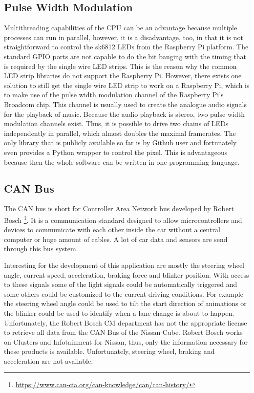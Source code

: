 \subsection{Pulse Width Modulation}
\label{ssec:pwm}
Multithreading capabilities of the CPU can be an advantage because multiple processes can run in parallel, however, it is a disadvantage, too, in that it is not straightforward to control the sk6812 LEDs from the Raspberry Pi platform. The standard GPIO ports are not capable to do the bit banging with the timing that is required by the single wire LED strips. This is the reason why the common LED strip libraries do not support the Raspberry Pi. However, there exists one solution to still get the single wire LED strip to work on a Raspberry Pi, which is to make use of the pulse width modulation channel of the Raspberry Pi's Broadcom chip. This channel is usually used to create the analogue audio signals for the playback of music. Because the audio playback is stereo, two pulse width modulation channels exist. Thus, it is possible to drive two chains of LEDs independently in parallel, which almost doubles the maximal framerates. The only library that is publicly available so far is by Github user \cite{Jgarff2018UserspaceLEDs} and fortunately even provides a Python wrapper to control the pixel. This is advantageous because then the whole software can be written in one programming language. 


\subsection{CAN Bus}
\label{ssec:CANbus}
The CAN bus is short for Controller Area Network bus developed by Robert Bosch \footnote{\url{https://www.can-cia.org/can-knowledge/can/can-history/}}. It is a communication standard designed to allow microcontrollers and devices to communicate with each other inside the car without a central computer or huge amount of cables. A lot of car data and sensors are send through this bus system. 

Interesting for the development of this application are mostly the steering wheel angle, current speed, acceleration, braking force and blinker position. With access to these signals some of the light signals could be automatically triggered and some others could be customized to the current driving conditions. For example the steering wheel angle could be used to tilt the start direction of animations or the blinker could be used to identify when a lane change is about to happen. Unfortunately, the Robert Bosch CM department has not the appropriate license to retrieve all data from the CAN Bus of the Nissan Cube. Robert Bosch works on Clusters and Infotainment for Nissan, thus, only the information necessary for these products is available. Unfortunately, steering wheel, braking and acceleration are not available. 

